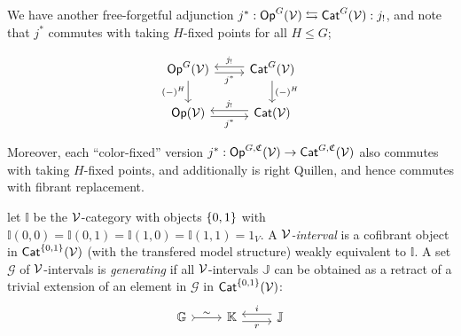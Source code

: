 \documentclass[a4paper,10pt
,draft
]{article}%
\newcommand{\I}{\mathbb I}
\newcommand{\J}{\mathbb J}
\renewcommand{\1}{\ensuremath{\mathbb{id}}}
\begin{document}
\begin{remark}
      \label{JSTAR_REM}        
      We have another free-forgetful adjunction $j^*: \mathsf{Op}^G(\mathcal V) \leftrightarrows \mathsf{Cat}^G(\mathcal V): j_!$,
      and note that $j^*$ commutes with taking $H$-fixed points for all $H\leq G$;
      
      \begin{equation}
            \begin{tikzcd}
                  \mathsf{Op}^G(\V) \arrow[d, "(-)^H"']
                  \arrow[r, shift right, "j^*"']
                  &
                  \mathsf{Cat}^G(\V) \arrow[l, shift right, swap, "j_!"] \arrow[d, "(-)^H"]
                  \\
                  \Op(\V) \arrow[r, shift right, "j^*"']
                  &
                  \Cat(\V) \arrow[l, shift right, swap, "j_!"]
            \end{tikzcd}
      \end{equation}
      
      Moreover, each ``color-fixed'' version
      $j^{\**}: \Op^{G, \mathfrak C}(\V) \to \Cat^{G, \mathfrak C}(\V)$
      also commutes with taking $H$-fixed points,
      and additionally is right Quillen, and hence commutes with fibrant replacement.
\end{remark}


\begin{definition}
      let $\I$ be the $\mathcal V$-category with objects $\left\{0,1\right\}$ with $\I(0,0) = \I(0,1) = \I(1,0) = \I(1,1) = 1_V$.
      A {\em $\mathcal V$-interval} is a cofibrant object in $\mathsf{Cat}^{\left\{0,1\right\}}(\mathcal V)$ (with the transfered model structure)
      weakly equivalent to $\I$.
      A set $\mathcal{G}$ of $\mathcal V$-intervals is {\em generating} if all $\mathcal V$-intervals $\J$ can be obtained
      as a retract of a trivial extension of an element in $\mathcal{G}$ in $\mathsf{Cat}^{\left\{0,1\right\}}(\mathcal V)$:
      \begin{equation}
            \begin{tikzcd}
                  \mathbb{G} \arrow[r,rightarrowtail, "\sim"]
                  &
                  \mathbb{K} \arrow[r,yshift=-.3em, "r"']
                  &
                  \mathbb{J} \arrow[l,yshift=.3em, "i"']
            \end{tikzcd}
      \end{equation}
\end{definition}
\end{document}
